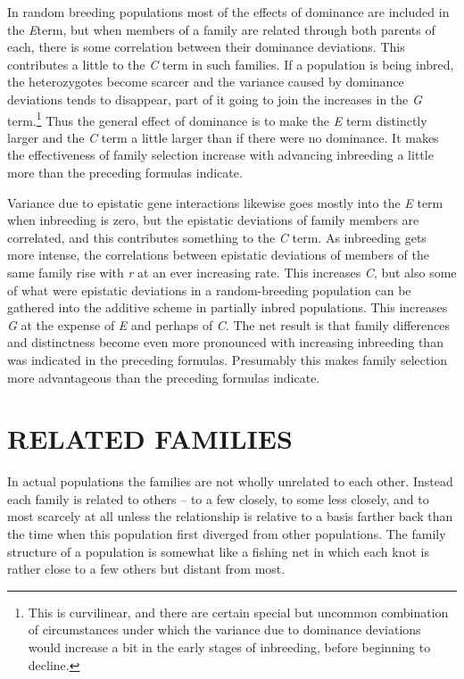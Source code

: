 In random breeding populations most of the effects of dominance
are included in the \textit{E}term, but when members of a family are related
through both parents of each, there is some correlation between their
dominance deviations. This contributes a little to the \textit{C} term in such
families. If a population is being inbred, the heterozygotes become scarcer
and the variance caused by dominance deviations tends to disappear,
part of it going to join the increases in the \textit{G} term.\footnote{This is
curvilinear, and there are certain special but uncommon combination
of circumstances under which the variance due to dominance deviations would
increase a bit in the early stages of inbreeding, before beginning to decline.} Thus the
general effect of dominance is to make the \textit{E} term distinctly larger and
the \textit{C} term a little larger than if there were no dominance. It makes the
effectiveness of family selection increase with advancing inbreeding a
little more than the preceding formulas indicate.

Variance due to epistatic gene interactions likewise goes mostly into
the \textit{E} term when inbreeding is zero, but the epistatic deviations of family
members are correlated, and this contributes something to the \textit{C}
term. As inbreeding gets more intense, the correlations between epistatic
deviations of members of the same family rise with \textit{r} at an ever increasing
rate. This increases \textit{C}, but also some of what were epistatic
deviations in a random-breeding population can be gathered into the
additive scheme in partially inbred populations. This increases \textit{G} at the
expense of \textit{E} and perhaps of \textit{C}. The net result is that family
differences and distinctness become even more pronounced with increasing
inbreeding than was indicated in the preceding formulas. Presumably
this makes family selection more advantageous than the preceding formulas
indicate.

\section*{RELATED FAMILIES}

In actual populations the families are not wholly unrelated to each
other. Instead each family is related to others -- to a few closely, to some
less closely, and to most scarcely at all unless the relationship is relative
to a basis farther back than the time when this population first diverged
from other populations. The family structure of a population is somewhat
like a fishing net in which each knot is rather close to a few others
but distant from most.

